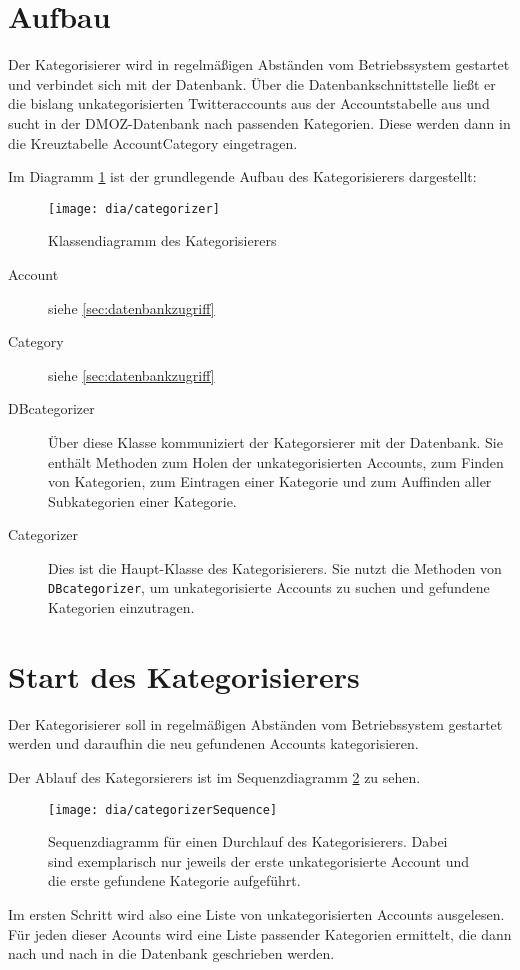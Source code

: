 \section{Aufbau}
Der Kategorisierer wird in regelmäßigen Abständen vom Betriebssystem gestartet und verbindet sich mit der Datenbank. Über die Datenbankschnittstelle ließt er die bislang unkategorisierten Twitteraccounts aus der Accountstabelle aus und sucht in der DMOZ-Datenbank nach passenden Kategorien. Diese werden dann in die Kreuztabelle AccountCategory eingetragen.

Im Diagramm \ref{fig:categorizer} ist der grundlegende Aufbau des Kategorisierers dargestellt:
\begin{figure}[h!]
	\centering
	\texttt{[image: dia/categorizer]}
	\caption{Klassendiagramm des Kategorisierers}
	\label{fig:categorizer}
\end{figure}
\begin{description}
	\item[Account] siehe \cref{sec:datenbankzugriff}
	\item[Category] siehe \cref{sec:datenbankzugriff}
	\item[DBcategorizer] Über diese Klasse kommuniziert der Kategorsierer mit der Datenbank. Sie enthält Methoden zum Holen der unkategorisierten Accounts, zum Finden von Kategorien, zum Eintragen einer Kategorie und zum Auffinden aller Subkategorien einer Kategorie.
	\item[Categorizer] Dies ist die Haupt-Klasse des Kategorisierers. Sie nutzt die Methoden von \lstinline{DBcategorizer}, um unkategorisierte Accounts zu suchen und gefundene Kategorien einzutragen.
\end{description}

\section{Start des Kategorisierers}
Der Kategorisierer soll in regelmäßigen Abständen vom Betriebssystem gestartet werden und daraufhin die neu gefundenen Accounts kategorisieren.

Der Ablauf des Kategorsierers ist im Sequenzdiagramm \ref{fig:categorizerSeq} zu sehen.
\begin{figure}[h!]
	\centering
	\texttt{[image: dia/categorizerSequence]}
	\caption{Sequenzdiagramm für einen Durchlauf des Kategorisierers. Dabei sind exemplarisch nur jeweils der erste unkategorisierte Account und die erste gefundene Kategorie aufgeführt.}
	\label{fig:categorizerSeq}
\end{figure}

Im ersten Schritt wird also eine Liste von unkategorisierten Accounts ausgelesen. Für jeden dieser Acounts wird eine Liste passender Kategorien ermittelt, die dann nach und nach in die Datenbank geschrieben werden.
